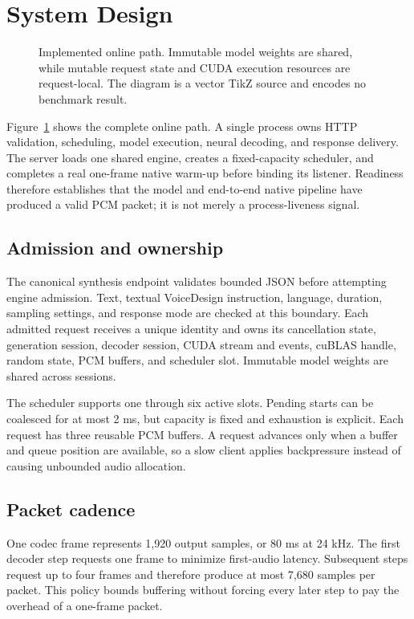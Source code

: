 \section{System Design}
\label{sec:system-design}

\begin{figure}[t]
  \centering
  
  \caption{Implemented online path. Immutable model weights are shared, while
  mutable request state and CUDA execution resources are request-local. The
  diagram is a vector TikZ source and encodes no benchmark result.}
  \label{fig:architecture}
\end{figure}

Figure~\ref{fig:architecture} shows the complete online path. A single process
owns HTTP validation, scheduling, model execution, neural decoding, and
response delivery. The server loads one shared engine, creates a fixed-capacity
scheduler, and completes a real one-frame native warm-up before binding its
listener. Readiness therefore establishes that the model and end-to-end native
pipeline have produced a valid PCM packet; it is not merely a process-liveness
signal.

\subsection{Admission and ownership}

The canonical synthesis endpoint validates bounded JSON before attempting
engine admission. Text, textual VoiceDesign instruction, language, duration,
sampling settings, and response mode are checked at this boundary. Each
admitted request receives a unique identity and owns its cancellation state,
generation session, decoder session, CUDA stream and events, cuBLAS handle,
random state, PCM buffers, and scheduler slot. Immutable model weights are
shared across sessions.

The scheduler supports one through six active slots. Pending starts can be
coalesced for at most 2 ms, but capacity is fixed and exhaustion is explicit.
Each request has three reusable PCM buffers. A request advances only when a
buffer and queue position are available, so a slow client applies backpressure
instead of causing unbounded audio allocation.

\subsection{Packet cadence}

One codec frame represents 1,920 output samples, or 80 ms at 24 kHz. The first
decoder step requests one frame to minimize first-audio latency. Subsequent
steps request up to four frames and therefore produce at most 7,680 samples per
packet. This policy bounds buffering without forcing every later step to pay
the overhead of a one-frame packet.

